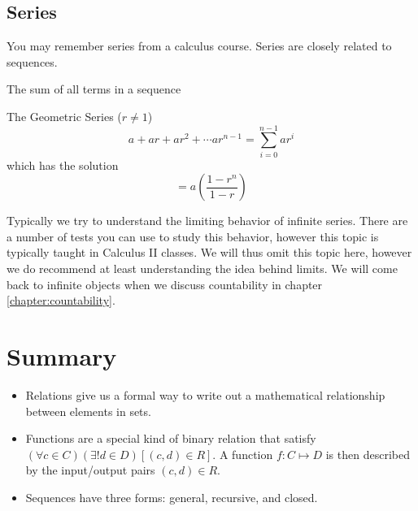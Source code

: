 \documentclass[main.tex]{subfiles}
\begin{document}
\subsection{Series}

You may remember series from a calculus course. Series are closely related to sequences.

\begin{defn}
	The sum of all terms in a sequence
\end{defn}

\begin{example}
	The Geometric Series (\(r \neq 1\)) \[a + ar + ar^2 + \cdots ar^{n-1} = \sum_{i=0}^{n-1} ar^i\]
	which has the solution \[= a(\frac{1-r^n}{1-r})\]
\end{example}

Typically we try to understand the limiting behavior of infinite series. There are a number of tests you can use to study this behavior, however this topic is typically taught in Calculus II classes. We will thus omit this topic here, however we do recommend at least understanding the idea behind limits. We will come back to infinite objects when we discuss countability in chapter \ref{chapter:countability}.


\section{Summary}

\begin{itemize}
	\item Relations give us a formal way to write out a mathematical relationship between elements in sets.
	\item Functions are a special kind of binary relation that satisfy \((\forall c \in C)(\exists! d \in D)[(c,d) \in R]\). A function \(f : C \mapsto D\) is then described by the input/output pairs \((c,d) \in R\).
	\item Sequences have three forms: general, recursive, and closed.
\end{itemize}
\end{document}
